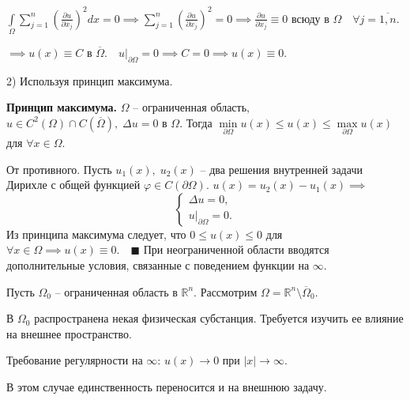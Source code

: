 $\int\limits_\Omega \sum_{j=1}^n \left (\frac{\partial u}{\partial x_j} \right )^2 dx = 0 \implies \sum_{j=1}^n \left (\frac{\partial u}{\partial x_j} \right )^2 = 0 \implies \frac{\partial u}{\partial x_j} \equiv 0 \text{ всюду в } \Omega \quad \forall j = \overline{1,n}.$

$\implies u(x) \equiv C$ в $\overline{\Omega}.\quad u|_{\partial \Omega} = 0 \implies C = 0 \implies u(x) \equiv 0$.

2) Используя принцип максимума.

\textbf{Принцип максимума.} $\Omega$ -- ограниченная область, $u \in C^2(\Omega) \cap C(\overline{\Omega}), \; \Delta u = 0$ в $\Omega$. Тогда $\min\limits_{\partial \Omega} u(x) \leq u(x) \leq \max\limits_{\partial \Omega} u(x)$ для $\forall x \in \Omega$. 

От противного. Пусть $u_1(x), \; u_2(x)$ -- два решения внутренней задачи Дирихле с общей функцией $\varphi \in C(\partial \Omega)$. $u(x) = u_2(x) - u_1(x) \implies$
\begin{equation*}
    \begin{cases}
    \Delta u = 0, \\
    u |_{\partial \Omega} = 0.
    \end{cases}
\end{equation*}
Из принципа максимума следует, что $0 \leq u(x) \leq 0$ для $\forall x \in \Omega \implies u(x) \equiv 0. \quad \blacksquare$
\newline \newline
При неограниченной области вводятся дополнительные условия, связанные с поведением функции на $\infty$.

Пусть $\Omega_0$ -- ограниченная область в $\mathbb{R}^n$. Рассмотрим $\Omega = \mathbb{R}^n \setminus \overline{\Omega}_0$.

В $\Omega_0$ распространена некая физическая субстанция. Требуется изучить ее влияние на внешнее пространство.

Требование регулярности на $\infty$: $u(x) \rightarrow 0$ при $|x| \rightarrow \infty$.

В этом случае единственность переносится и на внешнюю задачу.


